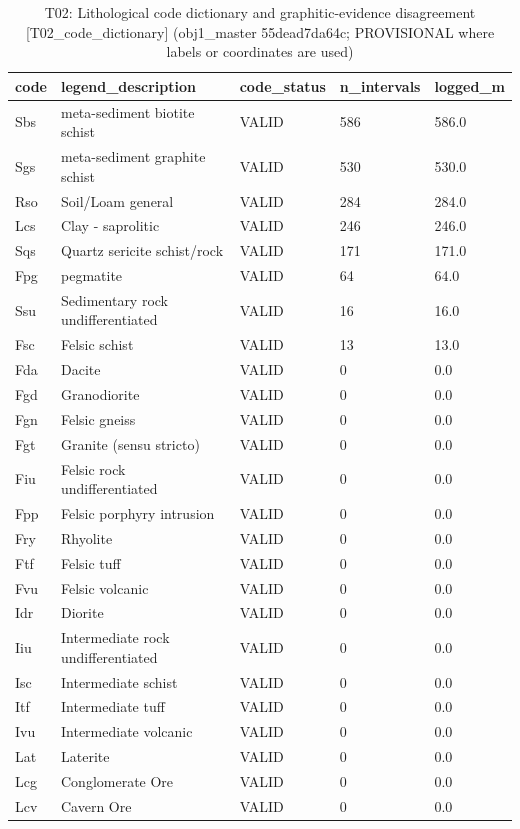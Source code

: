\begin{table}[htbp]
\centering
\caption{T02: Lithological code dictionary and graphitic-evidence disagreement [T02\_code\_dictionary] (obj1\_master 55dead7da64c; PROVISIONAL where labels or coordinates are used)}
\begin{tabular}{lllll}
\toprule
code & legend\_description & code\_status & n\_intervals & logged\_m \\
\midrule
Sbs & meta-sediment biotite schist & VALID & 586 & 586.0 \\
Sgs & meta-sediment graphite schist & VALID & 530 & 530.0 \\
Rso & Soil/Loam general & VALID & 284 & 284.0 \\
Lcs & Clay - saprolitic & VALID & 246 & 246.0 \\
Sqs & Quartz sericite schist/rock & VALID & 171 & 171.0 \\
Fpg & pegmatite & VALID & 64 & 64.0 \\
Ssu & Sedimentary rock undifferentiated & VALID & 16 & 16.0 \\
Fsc & Felsic schist & VALID & 13 & 13.0 \\
Fda & Dacite & VALID & 0 & 0.0 \\
Fgd & Granodiorite & VALID & 0 & 0.0 \\
Fgn & Felsic gneiss & VALID & 0 & 0.0 \\
Fgt & Granite (sensu stricto) & VALID & 0 & 0.0 \\
Fiu & Felsic rock undifferentiated & VALID & 0 & 0.0 \\
Fpp & Felsic porphyry intrusion & VALID & 0 & 0.0 \\
Fry & Rhyolite & VALID & 0 & 0.0 \\
Ftf & Felsic tuff & VALID & 0 & 0.0 \\
Fvu & Felsic volcanic & VALID & 0 & 0.0 \\
Idr & Diorite & VALID & 0 & 0.0 \\
Iiu & Intermediate rock undifferentiated & VALID & 0 & 0.0 \\
Isc & Intermediate schist & VALID & 0 & 0.0 \\
Itf & Intermediate tuff & VALID & 0 & 0.0 \\
Ivu & Intermediate volcanic & VALID & 0 & 0.0 \\
Lat & Laterite & VALID & 0 & 0.0 \\
Lcg & Conglomerate Ore & VALID & 0 & 0.0 \\
Lcv & Cavern Ore & VALID & 0 & 0.0 \\

\end{tabular}
\end{table}

